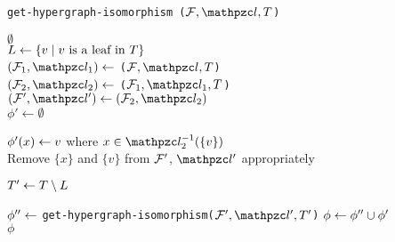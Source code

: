 \begin{algorithm}[h]
  \caption{{\tt get-hypergraph-isomorphism ($\cF, \cl, T$)}}
  \label{al:icppl-find-isomorph}
  \begin{algorithmic}[\lndisplay]

    \RETURN $\emptyset$\\
    \ENDIF
    \STATE $L \leftarrow \{v \mid v \text{ is a leaf in }      T\}$\\
    \STATE $(\cF_1, \cl_1) \assign$ {\tt \filteri($\cF, \cl,
      T$)}\\
    \STATE $(\cF_2, \cl_2) \assign$ {\tt \filterii($\cF_1,
      \cl_1, T$)}\\

    \STATE $(\cF', \cl') \assign (\cF_2, \cl_2)$\\
    \STATE $\phi' \leftarrow \emptyset$

     \STATE $\phi'(x) \leftarrow v$ where $x \in
    \cl_2^{-1}(\{v\})$ \\
    \STATE Remove $\{x\}$ and $\{v\}$ from ${\cal F}'$, $\cl'$  appropriately\\
    \ENDFOR

    \STATE $T' \leftarrow T \setminus L$

    \STATE $\phi'' \leftarrow$ {\tt get-hypergraph-isomorphism($\cF',
      \cl', T'$)}
    \STATE $\phi \leftarrow \phi'' \cup \phi'$ \\
    \RETURN $\phi$
  \end{algorithmic}
\end{algorithm}

